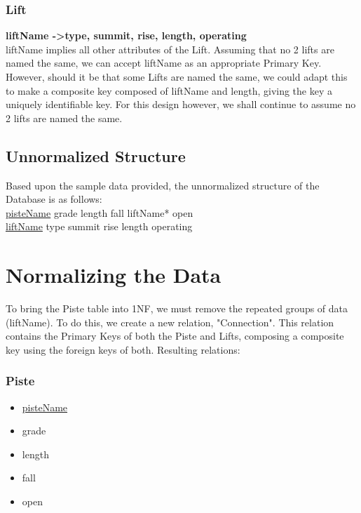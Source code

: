 \documentclass[11pt]{scrartcl} %
\newenvironment{myitemize}
{ \begin{itemize}[]
    \setlength{\itemsep}{0pt}
    \setlength{\parskip}{0pt}
    \setlength{\parsep}{0pt}     }
{ \end{itemize}                  }
\begin{document}
\subsubsection{Lift}
\textbf{liftName -\textgreater  type, summit, rise, length, operating}
\\[0.2cm]
liftName implies all other attributes of the Lift. Assuming that no 2 lifts are named the same, we can accept liftName as an appropriate Primary Key. However, should it be that some Lifts are named the same, we could adapt this to make a composite key composed of liftName and length, giving the key a uniquely identifiable key. For this design however, we shall continue to assume no 2 lifts are named the same.

\subsection{Unnormalized Structure}
Based upon the sample data provided, the unnormalized structure of the Database is as follows:
\\[0.2cm]
\underline{pisteName}\newline
grade\newline
length\newline
fall\newline
liftName*\newline
open\newline
\\[0.2cm]
\underline{liftName}\newline
type\newline
summit\newline
rise\newline
length\newline
operating\newline

\section{Normalizing the Data}

To bring the Piste table into 1NF, we must remove the repeated groups of data (liftName). To do this, we create a new relation, "Connection". This relation contains the Primary Keys of both the Piste and Lifts, composing a composite key using the foreign keys of both. Resulting relations:
\subsubsection{Piste}
\begin{myitemize}
\item\underline{pisteName}
\item grade
\item length
\item fall
\item open
\end{myitemize}
\end{document}
